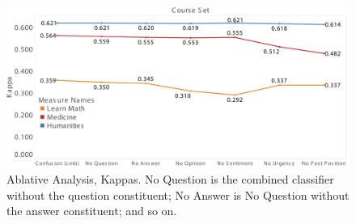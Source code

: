 \documentclass{edm_template}
\begin{document}

\begin{figure}[htp]
       \centering
       \includegraphics[width=1.0\textwidth]{../Figs/ablativeAnalysisCropped.png}
       \caption{\textnormal{Ablative Analysis, Kappas. No Question
           is the combined classifier without the question
           constituent; No Answer is No Question without the
           answer constituent; and so on.}}
       \label{fig:ablative}
\end{figure}
\end{document}
